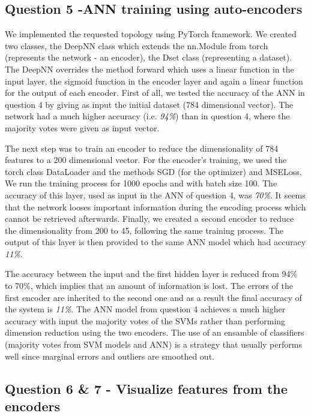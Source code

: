 \documentclass[12pt]{article}
\begin{document}
	\subsection{Question 5 -ANN training using auto-encoders}
	\label{encoders}
	We implemented the requested topology using PyTorch framework. We created two classes, the DeepNN class which extends the nn.Module from torch (represents the network - an encoder), the Dset class (representing a dataset). The DeepNN overrides the method forward which uses a linear function in the input layer, the sigmoid function in the encoder layer and again a linear function for the output of each encoder. First of all, we tested the accuracy of the ANN in question 4 by giving as input the initial dataset (784 dimensional vector). The network had a much higher accuracy (i.e. \emph{94\%}) than in question 4, where the majority votes were given as input vector.
	
	The next step was to train an encoder to reduce the dimensionality of 784 features to a 200 dimensional vector. For the encoder's training, we used the torch class DataLoader and the methods SGD (for the optimizer) and MSELoss. We run the training process for 1000 epochs and with batch size 100. The accuracy of this layer, used as input in the ANN of question 4, was \emph{70\%}. It seems that the network looses important information during the encoding process which cannot be retrieved afterwards. Finally, we created a second encoder to reduce the dimensionality from 200 to 45, following the same training process. The output of this layer is then provided to the same ANN model which had accuracy \emph{11\%}. 
	
	The accuracy between the input and the first hidden layer is reduced from 94\% to 70\%, which implies that an amount of information is lost. The errors of the first encoder are inherited to the second one and as a result the final accuracy of the system is \emph{11\%}. The ANN model from question 4 achieves a much higher accuracy with input the majority votes of the SVMs rather than performing dimension reduction using the two encoders. The use of an ensamble of classifiers (majority votes from SVM models and ANN) is a strategy that usually performs well since marginal errors and outliers are smoothed out.
	
	\subsection{Question 6 \& 7 - Visualize features from the encoders}
	
\end{document}
